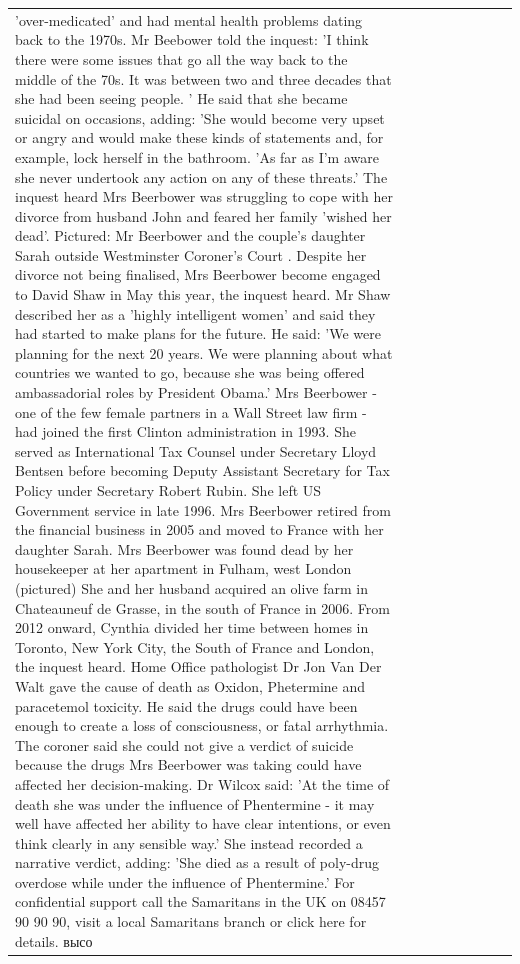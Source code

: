 \begin{table}[H]
\begin{tabular}{lllrlllll}
'over-medicated' and had mental health problems dating back to the 1970s. Mr Beebower told the inquest: 'I think there were some issues that go all the way back to the middle of the 70s. It was between two and three decades that she had been seeing people. ' He said that she became suicidal on occasions, adding: 'She would become very upset or angry and would make these kinds of statements and, for example, lock herself in the bathroom. 'As far as I'm aware she never undertook any action on any of these threats.' The inquest heard Mrs Beerbower was struggling to cope with her divorce from husband John and feared her family 'wished her dead'. Pictured: Mr Beerbower and the couple's daughter Sarah outside Westminster Coroner's Court . Despite her divorce not being finalised, Mrs Beerbower become engaged to David Shaw in May this year, the inquest heard. Mr Shaw described her as a 'highly intelligent women' and said they had started to make plans for the future. He said: 'We were planning for the next 20 years. We were planning about what countries we wanted to go, because she was being offered ambassadorial roles by President Obama.' Mrs Beerbower - one of the few female partners in a Wall Street law firm - had joined the first Clinton administration in 1993. She served as International Tax Counsel under Secretary Lloyd Bentsen before becoming Deputy Assistant Secretary for Tax Policy under Secretary Robert Rubin. She left US Government service in late 1996. Mrs Beerbower retired from the financial business in 2005 and moved to France with her daughter Sarah. Mrs Beerbower was found dead by her housekeeper at her apartment in Fulham, west London (pictured) She and her husband acquired an olive farm in Chateauneuf de Grasse, in the south of France in 2006. From 2012 onward, Cynthia divided her time between homes in Toronto, New York City, the South of France and London, the inquest heard. Home Office pathologist Dr Jon Van Der Walt gave the cause of death as Oxidon, Phetermine and paracetemol toxicity. He said the drugs could have been enough to create a loss of consciousness, or fatal arrhythmia. The coroner said she could not give a verdict of suicide because the drugs Mrs Beerbower was taking could have affected her decision-making. Dr Wilcox said: 'At the time of death she was under the influence of Phentermine - it may well have affected her ability to have clear intentions, or even think clearly in any sensible way.' She instead recorded a narrative verdict, adding: 'She died as a result of poly-drug overdose while under the influence of Phentermine.' For confidential support call the Samaritans in the UK on 08457 90 90 90, visit a local Samaritans branch or click here for details. высо \\

\end{tabular}
\end{table}
